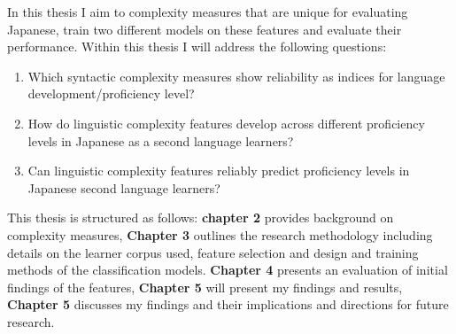 In this thesis I aim to complexity measures that are unique for evaluating Japanese, train two different models on
these features and evaluate their performance. Within this thesis I will address the following questions:
\begin{enumerate}
    \item Which syntactic complexity measures show reliability as indices for language development/proficiency level?
    \item How do linguistic complexity features develop across different proficiency levels in Japanese as a second language learners?
    \item Can linguistic complexity features reliably predict proficiency levels in Japanese second language learners?
\end{enumerate}

This thesis is structured as follows: \textbf{chapter 2} provides background on complexity measures, \textbf{Chapter 3} outlines the research methodology including details on the learner corpus used, feature selection and design and training methods of the
classification models. \textbf{Chapter 4} presents an evaluation of initial findings of the features,
\textbf{Chapter 5 }will present my findings and results, \textbf{Chapter 5} discusses my
findings and their implications and directions for future research.